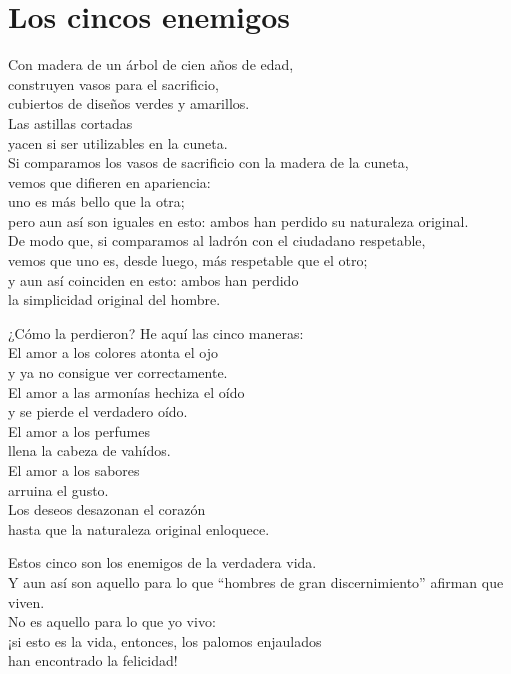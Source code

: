 \documentclass[hidelinks]{memoir}
\begin{document}
	\chapter*{Los cincos enemigos}
	
	Con madera de un árbol de cien años de edad,\\
	construyen vasos para el sacrificio,\\
	cubiertos de diseños verdes y amarillos.\\
	Las astillas cortadas\\
	yacen si ser utilizables en la cuneta.\\
	Si comparamos los vasos de sacrificio con la madera de la cuneta,\\
	vemos que difieren en apariencia:\\
	uno es más bello que la otra;\\
	pero aun así son iguales en esto: ambos han perdido su naturaleza
	original.\\
	De modo que, si comparamos al ladrón con el ciudadano respetable,\\
	vemos que uno es, desde luego, más respetable que el otro;\\
	y aun así coinciden en esto: ambos han perdido\\
	la simplicidad original del hombre.
	
	¿Cómo la perdieron? He aquí las cinco maneras:\\
	El amor a los colores atonta el ojo\\
	y ya no consigue ver correctamente.\\
	El amor a las armonías hechiza el oído\\
	y se pierde el verdadero oído.\\
	El amor a los perfumes\\
	llena la cabeza de vahídos.\\
	El amor a los sabores\\
	arruina el gusto.\\
	Los deseos desazonan el corazón\\
	hasta que la naturaleza original enloquece.
	
	Estos cinco son los enemigos de la verdadera vida.\\
	Y aun así son aquello para lo que ``hombres de gran discernimiento''
	afirman que viven.\\
	No es aquello para lo que yo vivo:\\
	¡si esto es la vida, entonces, los palomos enjaulados\\
	han encontrado la felicidad!
	
\end{document}
